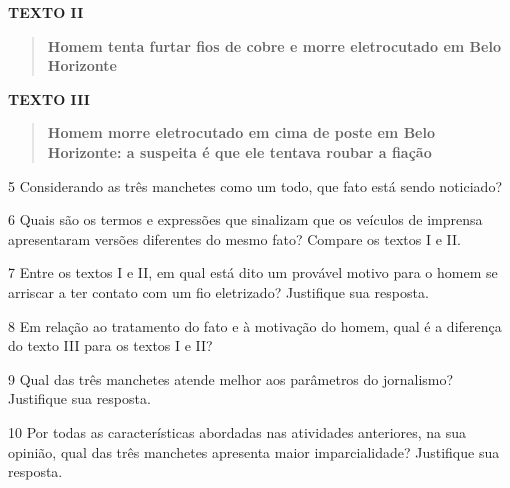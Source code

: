 \textbf{TEXTO II}

\begin{quote}
\textbf{Homem tenta furtar fios de cobre e morre eletrocutado em Belo
Horizonte}
\end{quote}

\textbf{TEXTO III}

\begin{quote}
\textbf{Homem morre eletrocutado em cima de poste em Belo Horizonte: a
suspeita é que ele tentava roubar a fiação}
\end{quote}

\num{5} Considerando as três manchetes como um todo, que fato está sendo
noticiado?


\num{6} Quais são os termos e expressões que sinalizam que os veículos
de imprensa apresentaram versões diferentes do mesmo fato? Compare os
textos I e II.


\num{7} Entre os textos I e II, em qual está dito um provável motivo
para o homem se arriscar a ter contato com um fio eletrizado? Justifique
sua resposta.


\num{8} Em relação ao tratamento do fato e à motivação do homem, qual é
a diferença do texto III para os textos I e II?


\num{9} Qual das três manchetes atende melhor aos parâmetros do
jornalismo? Justifique sua resposta.


\num{10} Por todas as características abordadas nas atividades
anteriores, na sua opinião, qual das três manchetes apresenta maior
imparcialidade? Justifique sua resposta.


